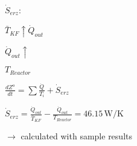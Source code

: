 \( \dot{S}_{erz} \):  

\( \bar{T}_{KF} \uparrow \dot{Q}_{out} \)  

\( \dot{Q}_{out} \uparrow \)  

\( T_{Reactor} \)  

\( \frac{dZ^o}{dt} = \sum \frac{\dot{Q}}{T_i} + \dot{S}_{erz} \)  

\( \dot{S}_{erz} = \frac{\dot{Q}_{out}}{\bar{T}_{KF}} - \frac{\dot{Q}_{out}}{T_{Reactor}} = 46.15 \, \text{W/K} \)  

\( \rightarrow \) calculated with sample results